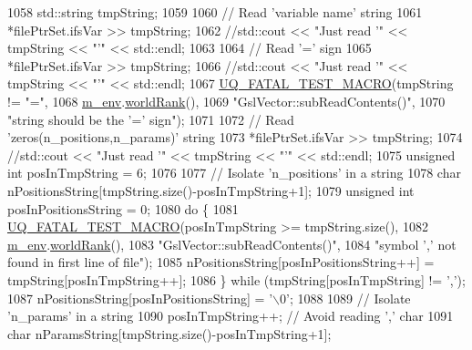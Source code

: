 \begin{DoxyCode}
1058     std::string tmpString;
1059 
1060     \textcolor{comment}{// Read 'variable name' string}
1061     *filePtrSet.ifsVar >> tmpString;
1062     \textcolor{comment}{//std::cout << "Just read '" << tmpString << "'" << std::endl;}
1063 
1064     \textcolor{comment}{// Read '=' sign}
1065     *filePtrSet.ifsVar >> tmpString;
1066     \textcolor{comment}{//std::cout << "Just read '" << tmpString << "'" << std::endl;}
1067     \hyperlink{_defines_8h_a56d63d18d0a6d45757de47fcc06f574d}{UQ\_FATAL\_TEST\_MACRO}(tmpString != \textcolor{stringliteral}{"="},
1068                         \hyperlink{class_q_u_e_s_o_1_1_vector_ae7615172bb1e54339151d3f3d71a0344}{m\_env}.\hyperlink{class_q_u_e_s_o_1_1_base_environment_a78b57112bbd0e6dd0e8afec00b40ffa7}{worldRank}(),
1069                         \textcolor{stringliteral}{"GslVector::subReadContents()"},
1070                         \textcolor{stringliteral}{"string should be the '=' sign"});
1071 
1072     \textcolor{comment}{// Read 'zeros(n\_positions,n\_params)' string}
1073     *filePtrSet.ifsVar >> tmpString;
1074     \textcolor{comment}{//std::cout << "Just read '" << tmpString << "'" << std::endl;}
1075     \textcolor{keywordtype}{unsigned} \textcolor{keywordtype}{int} posInTmpString = 6;
1076 
1077     \textcolor{comment}{// Isolate 'n\_positions' in a string}
1078     \textcolor{keywordtype}{char} nPositionsString[tmpString.size()-posInTmpString+1];
1079     \textcolor{keywordtype}{unsigned} \textcolor{keywordtype}{int} posInPositionsString = 0;
1080     \textcolor{keywordflow}{do} \{
1081       \hyperlink{_defines_8h_a56d63d18d0a6d45757de47fcc06f574d}{UQ\_FATAL\_TEST\_MACRO}(posInTmpString >= tmpString.size(),
1082                           \hyperlink{class_q_u_e_s_o_1_1_vector_ae7615172bb1e54339151d3f3d71a0344}{m\_env}.\hyperlink{class_q_u_e_s_o_1_1_base_environment_a78b57112bbd0e6dd0e8afec00b40ffa7}{worldRank}(),
1083                           \textcolor{stringliteral}{"GslVector::subReadContents()"},
1084                           \textcolor{stringliteral}{"symbol ',' not found in first line of file"});
1085       nPositionsString[posInPositionsString++] = tmpString[posInTmpString++];
1086     \} \textcolor{keywordflow}{while} (tmpString[posInTmpString] != \textcolor{charliteral}{','});
1087     nPositionsString[posInPositionsString] = \textcolor{charliteral}{'\(\backslash\)0'};
1088 
1089     \textcolor{comment}{// Isolate 'n\_params' in a string}
1090     posInTmpString++; \textcolor{comment}{// Avoid reading ',' char}
1091     \textcolor{keywordtype}{char} nParamsString[tmpString.size()-posInTmpString+1];

\end{DoxyCode}
